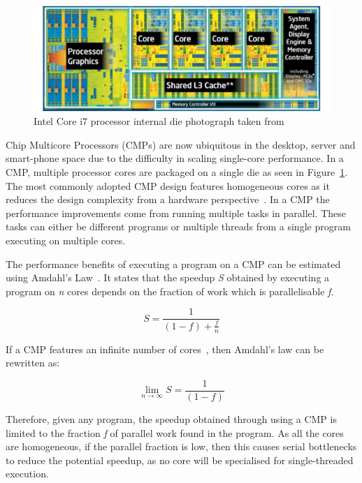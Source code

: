 \begin{figure}[t]
 \center
 \includegraphics[width=1\textwidth]{background/graphics/i7intel.pdf}
 \caption{Intel Core i7 processor internal die photograph taken from~\cite{turleywhite}}\label{fig:i7}
\end{figure}
 
Chip Multicore Processors (CMPs) are now ubiquitous in the desktop, server and smart-phone space due to the difficulty in scaling single-core performance.
In a CMP, multiple processor cores are packaged on a single die as seen in Figure~\ref{fig:i7}.
The most commonly adopted CMP design features homogeneous cores as it reduces the design complexity from a hardware perspective~\cite{asanovic2006landscape}.
In a CMP the performance improvements come from running multiple tasks in parallel.
These tasks can either be different programs or multiple threads from a single program executing on multiple cores.

The performance benefits of executing a program on a CMP can be estimated using Amdahl's Law~\cite{amdahl1967validity}.
It states that the speedup \textit{S} obtained by executing a program on \textit{n} cores depends on the fraction of work which is parallelisable \textit{f}.

\begin{equation}
S = \frac{1}{(1-f) + \frac{f}{n}}
\end{equation}\label{amdlaw}

If a CMP features an infinite number of cores~\cite{eyerman2010amdahl}, then Amdahl's law can be rewritten as:

\begin{equation}
\lim_{n\to\infty} S = \frac{1}{(1-f)}
\end{equation}

Therefore, given any program, the speedup obtained through using a CMP is limited to the fraction \textit{f} of parallel work found in the program.
As all the cores are homogeneous, if the parallel fraction is low, then this causes serial bottlenecks to reduce the potential speedup, as no core will be specialised for single-threaded execution.

